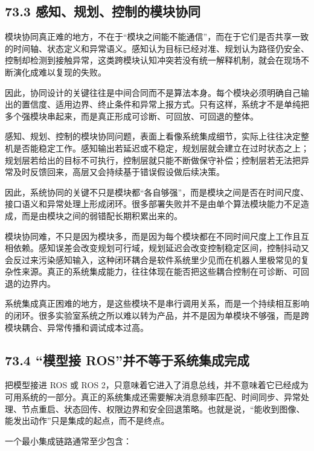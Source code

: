 \subsection*{73.3 感知、规划、控制的模块协同}


模块协同真正难的地方，不在于“模块之间能不能通信”，而在于它们是否共享一致的时间轴、状态定义和异常语义。感知认为目标已经对准、规划认为路径仍安全、控制却检测到接触异常，这类跨模块认知冲突若没有统一解释机制，就会在现场不断演化成难以复现的失败。

因此，协同设计的关键往往是中间合同而不是算法本身。每个模块必须明确自己输出的置信度、适用边界、终止条件和异常上报方式。只有这样，系统才不是单纯把多个强模块串起来，而是真正形成可诊断、可回放、可回退的整体。

感知、规划、控制的模块协同问题，表面上看像系统集成细节，实际上往往决定整机是否能稳定工作。感知输出若延迟或不稳定，规划层就会建立在过时状态之上；规划层若给出的目标不可执行，控制层就只能不断做保守补偿；控制层若无法把异常及时反馈回来，高层又会持续基于错误假设做后续决策。

因此，系统协同的关键不只是模块都“各自够强”，而是模块之间是否在时间尺度、接口语义和异常处理上形成闭环。很多部署失败并不是由单个算法模块能力不足造成，而是由模块之间的弱错配长期积累出来的。

模块协同难，不只是因为模块多，而是因为每个模块都在不同时间尺度上工作且互相依赖。感知误差会改变规划可行域，规划延迟会改变控制稳定区间，控制抖动又会反过来污染感知输入，这种闭环耦合是软件系统里少见而在机器人里极常见的复杂性来源。真正的系统集成能力，往往体现在能否把这些耦合控制在可诊断、可回退的边界内。

系统集成真正困难的地方，是这些模块不是串行调用关系，而是一个持续相互影响的闭环。很多实验室系统之所以难以转为产品，并不是因为单模块不够强，而是跨模块耦合、异常传播和调试成本过高。

\subsection*{73.4 “模型接 ROS”并不等于系统集成完成}


把模型接进 ROS 或 ROS 2，只意味着它进入了消息总线，并不意味着它已经成为可用系统的一部分。真正的系统集成还需要解决消息频率匹配、时间同步、异常处理、节点重启、状态回传、权限边界和安全回退策略。也就是说，“能收到图像、能发出动作”只是集成的起点，而不是终点。

一个最小集成链路通常至少包含：


